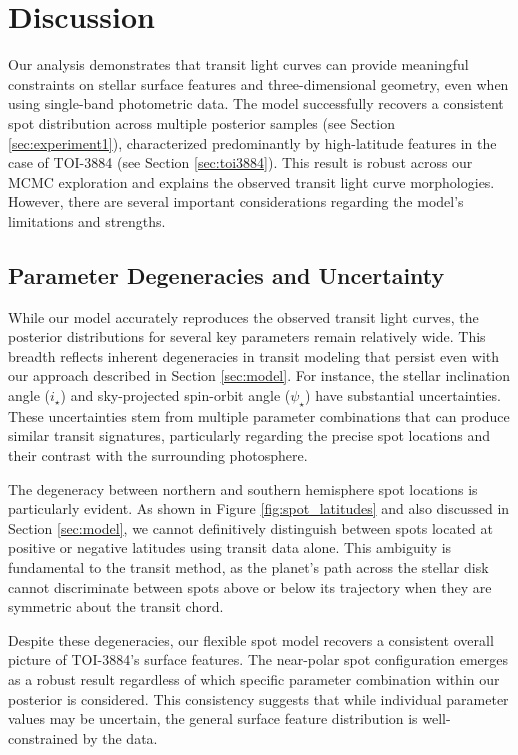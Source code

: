 \documentclass[twocolumn]{aastex631}
\begin{document}
\section{Discussion}
\label{sec:discussion}
Our analysis demonstrates that transit light curves can provide meaningful constraints on stellar surface features and 
three-dimensional geometry, even when using single-band photometric data. The model successfully recovers a consistent spot 
distribution across multiple posterior samples (see Section \ref{sec:experiment1}), characterized predominantly by high-latitude 
features in the case of TOI-3884 (see Section \ref{sec:toi3884}). 
This result is robust across our MCMC exploration and explains the observed transit light curve morphologies. 
However, there are several important considerations regarding the model's limitations and strengths.

\subsection{Parameter Degeneracies and Uncertainty}

While our model accurately reproduces the observed transit light curves, the posterior distributions for several key 
parameters remain relatively wide. This breadth reflects inherent degeneracies in transit modeling that persist even 
with our approach described in Section \ref{sec:model}. For instance, the stellar inclination angle 
($i_\star$) and sky-projected spin-orbit angle 
($\psi_\star$) have substantial uncertainties. These uncertainties stem 
from multiple parameter combinations that can produce similar transit signatures, particularly regarding the precise spot 
locations and their contrast with the surrounding photosphere.

The degeneracy between northern and southern hemisphere spot locations is particularly evident. As shown in Figure 
\ref{fig:spot_latitudes} and also discussed in Section \ref{sec:model}, we cannot definitively distinguish 
between spots located at positive or negative latitudes using 
transit data alone. This ambiguity is fundamental to the transit method, as the planet's path across the stellar disk 
cannot discriminate between spots above or below its trajectory when they are symmetric about the transit chord.

Despite these degeneracies, our flexible spot model recovers a consistent overall picture of TOI-3884's surface features. 
The near-polar spot configuration emerges as a robust result regardless of which specific parameter combination within our 
posterior is considered. This consistency suggests that while individual parameter values may be uncertain, the general 
surface feature distribution is well-constrained by the data.
\end{document}
